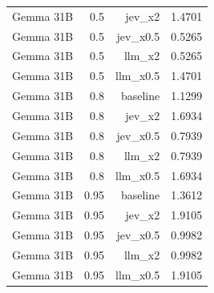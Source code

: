 \begin{tabular}{lrrr}
Gemma 31B & 0.5 & jev\_x2 & 1.4701 \\
Gemma 31B & 0.5 & jev\_x0.5 & 0.5265 \\
Gemma 31B & 0.5 & llm\_x2 & 0.5265 \\
Gemma 31B & 0.5 & llm\_x0.5 & 1.4701 \\
Gemma 31B & 0.8 & baseline & 1.1299 \\
Gemma 31B & 0.8 & jev\_x2 & 1.6934 \\
Gemma 31B & 0.8 & jev\_x0.5 & 0.7939 \\
Gemma 31B & 0.8 & llm\_x2 & 0.7939 \\
Gemma 31B & 0.8 & llm\_x0.5 & 1.6934 \\
Gemma 31B & 0.95 & baseline & 1.3612 \\
Gemma 31B & 0.95 & jev\_x2 & 1.9105 \\
Gemma 31B & 0.95 & jev\_x0.5 & 0.9982 \\
Gemma 31B & 0.95 & llm\_x2 & 0.9982 \\
Gemma 31B & 0.95 & llm\_x0.5 & 1.9105 \\
\bottomrule
\end{tabular}
